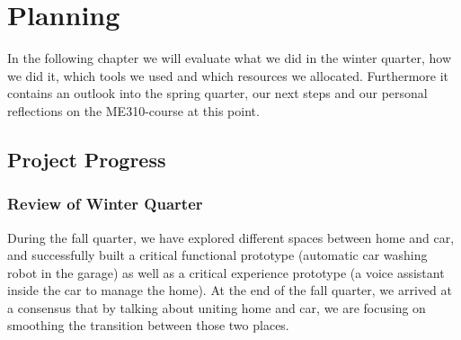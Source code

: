 \chapter{Planning}
\label{project-planning}



\vspace{1em}

In the following chapter we will evaluate what we did in the winter quarter, how we did it, which tools we used and which resources we allocated. Furthermore it contains an outlook into the spring quarter, our next steps and our personal reflections on the ME310-course at this point.

\section{Project Progress}

\subsection{Review of Winter Quarter}

During the fall quarter, we have explored different spaces between home and car, and successfully built a critical functional prototype (automatic car washing robot in the garage) as well as a critical experience prototype (a voice assistant inside the car to manage the home). At the end of the fall quarter, we arrived at a consensus that by talking about uniting home and car, we are focusing on smoothing the transition between those two places.


